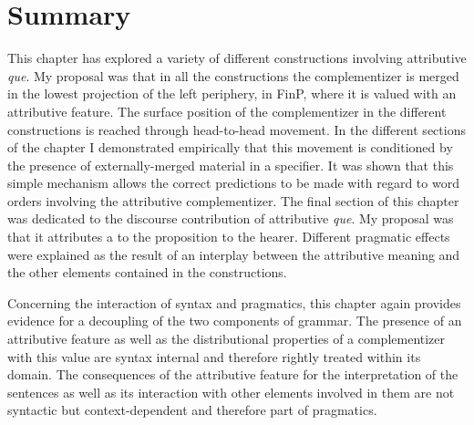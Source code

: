 \section{Summary}
This chapter has explored a variety of different constructions involving attributive \emph{que}.  My proposal was that in all the constructions  the complementizer is merged in the lowest projection of the left periphery, in FinP, where it is valued with an attributive feature.  The surface position of the complementizer in the different constructions is reached through head-to-head movement. In the different sections of the chapter I demonstrated empirically that this movement is conditioned by the presence of externally-merged material in a specifier. It was shown that this simple mechanism allows the correct predictions to be made with regard  to word orders involving the attributive complementizer.  The final section of this chapter was dedicated to the discourse contribution of attributive \emph{que}. My proposal was that it attributes a  to the   proposition to the hearer. Different pragmatic effects were explained as the result of an interplay between the attributive meaning and the other elements contained in the constructions. 

Concerning the interaction of syntax and pragmatics, this chapter again provides evidence for a decoupling of the two components of grammar. The presence of an attributive  feature  as well as the  distributional properties of a complementizer with this value are syntax internal and therefore rightly treated within its domain. The consequences of the attributive feature for the interpretation of the sentences as well as its interaction with other elements involved in them are not syntactic but context-dependent and therefore part of pragmatics. 
